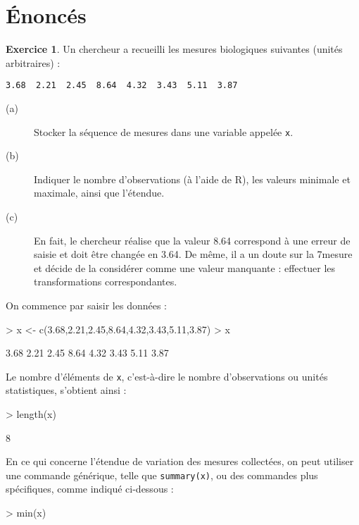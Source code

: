\documentclass[11pt]{report}
\theoremstyle{definition}
\newtheorem{exo}{Exercice}[chapter]
\newcommand{\R}{\textsf{R}\xspace}
\begin{document}
\section*{Énoncés}
%
%
%
\begin{exo}\label{exo:1.1}
Un chercheur a recueilli les mesures biologiques suivantes (unités
arbitraires) :
\begin{verbatim}
3.68  2.21  2.45  8.64  4.32  3.43  5.11  3.87
\end{verbatim}
\begin{description}
\item[(a)] Stocker la séquence de mesures dans une variable appelée
  \texttt{x}.  
\item[(b)] Indiquer le nombre d'observations (à l'aide de \R), les valeurs
  minimale et maximale, ainsi que l'étendue.  
\item[(c)] En fait, le chercheur réalise que la valeur 8.64 correspond à une
  erreur de saisie et doit être changée en 3.64. De même, il a un doute sur
  la 7\ieme mesure et décide de la considérer comme une valeur manquante :
  effectuer les transformations correspondantes. 
\end{description}
\begin{sol}
On commence par saisir les données :
\begin{Schunk}
\begin{Sinput}
> x <- c(3.68,2.21,2.45,8.64,4.32,3.43,5.11,3.87)
> x
\end{Sinput}
\begin{Soutput}
[1] 3.68 2.21 2.45 8.64 4.32 3.43 5.11 3.87
\end{Soutput}
\end{Schunk}
Le nombre d'éléments de \texttt{x}, c'est-à-dire le nombre d'observations ou
unités statistiques, s'obtient ainsi :
\begin{Schunk}
\begin{Sinput}
> length(x)
\end{Sinput}
\begin{Soutput}
[1] 8
\end{Soutput}
\end{Schunk}
En ce qui concerne l'étendue de variation des mesures collectées, on peut
utiliser une commande générique, telle que \verb|summary(x)|, ou des
commandes plus spécifiques, comme indiqué ci-dessous :
\begin{Schunk}
\begin{Sinput}
> min(x)
\end{Sinput}
\begin{Soutput}

\end{Soutput}
\end{Schunk}
\end{sol}
\end{exo}
\end{document}
